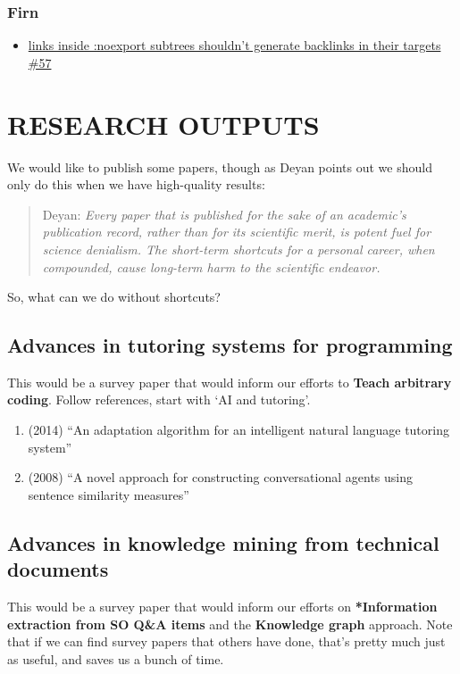\documentclass[11pt]{article}
\begin{document}
\subsubsection{Firn}
\label{sec:org3edbc9d}

\begin{itemize}
\item \href{https://github.com/theiceshelf/firn/issues/57}{links inside :noexport subtrees shouldn't generate backlinks in their targets \#57}
\end{itemize}
\section{RESEARCH OUTPUTS}
\label{sec:orgf9b2350}
We would like to publish some papers, though as Deyan points out we
should only do this when we have high-quality results:

\begin{quote}
Deyan: \emph{Every paper that is published for the sake of an academic's publication record, rather than for its scientific merit, is potent fuel for science denialism. The short-term shortcuts for a personal career, when compounded, cause long-term harm to the scientific endeavor.}
\end{quote}

So, what can we do without shortcuts?

\subsection{Advances in tutoring systems for programming}
\label{sec:org092370c}
This would be a survey paper that would inform our efforts to \textbf{Teach arbitrary coding}.
Follow references, start with ‘AI and tutoring’.

\begin{enumerate}
\item (2014) ``An adaptation algorithm for an intelligent natural language tutoring system''
\item (2008) ``A novel approach for constructing conversational agents using sentence similarity measures''
\end{enumerate}
\subsection{Advances in knowledge mining from technical documents}
\label{sec:orgc9fab61}
This would be a survey paper that would inform our efforts on
\textbf{*Information extraction from SO Q\&A items} and the \textbf{Knowledge graph}
approach.  Note that if we can find survey papers that others have
done, that’s pretty much just as useful, and saves us a bunch of time.
\end{document}
